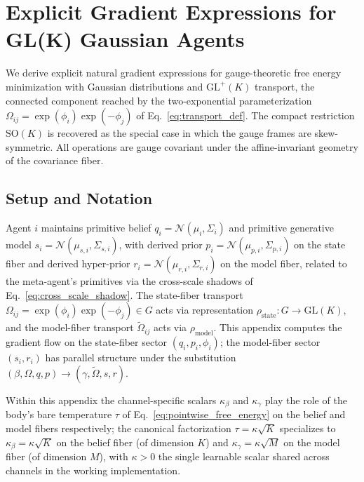 \documentclass[11pt]{article}
\begin{document}
\appendix

\section*{Explicit Gradient Expressions for GL(K) Gaussian Agents}

We derive explicit natural gradient expressions for gauge-theoretic free energy minimization with Gaussian distributions and $\mathrm{GL}^+(K)$ transport, the connected component reached by the two-exponential parameterization $\Omega_{ij} = \exp(\phi_i)\exp(-\phi_j)$ of Eq.~\eqref{eq:transport_def}. The compact restriction $\mathrm{SO}(K)$ is recovered as the special case in which the gauge frames are skew-symmetric. All operations are gauge covariant under the affine-invariant geometry of the covariance fiber.

\subsection*{Setup and Notation}

Agent $i$ maintains primitive belief $q_i = \mathcal{N}(\mu_i, \Sigma_i)$ and primitive generative model $s_i = \mathcal{N}(\mu_{s,i}, \Sigma_{s,i})$, with derived prior $p_i = \mathcal{N}(\mu_{p,i}, \Sigma_{p,i})$ on the state fiber and derived hyper-prior $r_i = \mathcal{N}(\mu_{r,i}, \Sigma_{r,i})$ on the model fiber, related to the meta-agent's primitives via the cross-scale shadows of Eq.~\eqref{eq:cross_scale_shadow}. The state-fiber transport $\Omega_{ij} = \exp(\phi_i)\exp(-\phi_j) \in G$ acts via representation $\rho_{\mathrm{state}}: G \to \mathrm{GL}(K)$, and the model-fiber transport $\tilde\Omega_{ij}$ acts via $\rho_{\mathrm{model}}$. This appendix computes the gradient flow on the state-fiber sector $(q_i, p_i, \phi_i)$; the model-fiber sector $(s_i, r_i)$ has parallel structure under the substitution $(\beta, \Omega, q, p) \to (\gamma, \tilde\Omega, s, r)$.

Within this appendix the channel-specific scalars $\kappa_\beta$ and $\kappa_\gamma$ play the role of the body's bare temperature $\tau$ of Eq.~\eqref{eq:pointwise_free_energy} on the belief and model fibers respectively; the canonical factorization $\tau = \kappa\sqrt{K}$ specializes to $\kappa_\beta = \kappa\sqrt{K}$ on the belief fiber (of dimension $K$) and $\kappa_\gamma = \kappa\sqrt{M}$ on the model fiber (of dimension $M$), with $\kappa > 0$ the single learnable scalar shared across channels in the working implementation.
\end{document}

